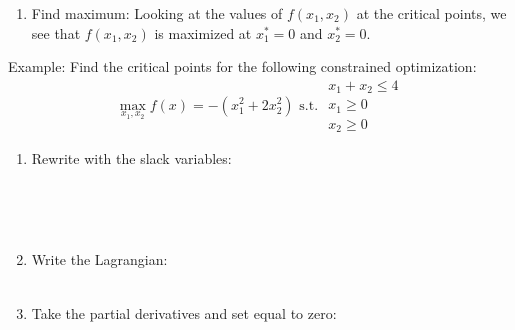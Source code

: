 \documentclass[]{book}
\providecommand{\tightlist}{%
  \setlength{\itemsep}{0pt}\setlength{\parskip}{0pt}}
\theoremstyle{definition}
\theoremstyle{definition}
\theoremstyle{definition}
\theoremstyle{remark}
\let\BeginKnitrBlock\begin \let\EndKnitrBlock\end
\begin{document}
\begin{enumerate}
\def\labelenumi{\arabic{enumi}.}
\setcounter{enumi}{4}
\tightlist
\item
  Find maximum: Looking at the values of \(f(x_1,x_2)\) at the critical
  points, we see that \(f(x_1,x_2)\) is maximized at \(x_1^* = 0\) and
  \(x_2^*=0\).
\end{enumerate}

\BeginKnitrBlock{exercise}
\protect\hypertarget{exr:unnamed-chunk-62}{}{\label{exr:unnamed-chunk-62}
}Example: Find the critical points for the following constrained
optimization: \[\max_{x_1,x_2} f(x) = -(x_1^2 + 2x_2^2) \text{ s.t. } 
\begin{array}{l}
x_1 + x_2 \le 4\\
x_1 \ge 0\\
x_2 \ge 0
\end{array}\]
\EndKnitrBlock{exercise}

\begin{enumerate}
\def\labelenumi{\arabic{enumi}.}
\item
  Rewrite with the slack variables:
  \[\phantom{max_{x_1,x_2} f(x) = -(x_1^2 + 2x_2^2) \text{ s.t. } 
  \begin{array}{l}
  x_1 + x_2 \le 4 - s_1^2\\
  -x_1 \le 0 - s_2^2\\
  -x_2 \le 0 - s_3^2
  \end{array}}\]
\item
  Write the Lagrangian:
  \[\phantom{L(x_1, x_2, \lambda_1, \lambda_2, \lambda_3, s_1, s_2, s_3) =  -(x_1^2 + 2x_2^2) - \lambda_1(x_1 + x_2 + s_1^2  - 4) - \lambda_2(-x_1 + s_2^2) - \lambda_3(-x_2 + s_3^2)}\]
\item
  Take the partial derivatives and set equal to zero:
\end{enumerate}

\end{document}
